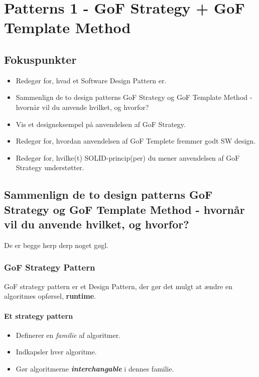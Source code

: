 \section{Patterns 1 - GoF Strategy + GoF Template Method}

\subsection{Fokuspunkter}

\begin{itemize}
	\item Redegør for, hvad et Software Design Pattern er.
	\item Sammenlign de to design patterns GoF Strategy og GoF Template Method - hvornår vil du anvende hvilket, og hvorfor?
	\item Vis et designeksempel på anvendelsen af GoF Strategy.
	\item Redegør for, hvordan anvendelsen af GoF Templete fremmer godt SW design.
	\item Redegør for, hvilke(t) SOLID-princip(per) du mener anvendelsen af GoF Strategy understøtter.
\end{itemize}



\subsection{Sammenlign de to design patterns GoF Strategy og GoF Template Method - hvornår vil du anvende hvilket, og hvorfor?}
De er begge herp derp noget gøgl.

\subsubsection{GoF Strategy Pattern}
GoF strategy pattern er et Design Pattern, der gør det mulgt at ændre en algoritmes opførsel, \textbf{runtime}.

\paragraph{Et strategy pattern}
\begin{itemize}
	\item Definerer en \textit{familie} af algoritmer.
	\item Indkapsler hver algoritme.
	\item Gør algoritmerne \textbf{\textit{interchangable}} i dennes familie.
\end{itemize}

